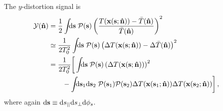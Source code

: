 \documentclass[fleqn,usenatbib]{mnras}
\begin{document}
    The $y$-distortion signal is 
    \begin{align}
        \Yd(\nhat)
            &=  \frac{1}{2}
                \int\!\!\!\dif{\mbf{s}}\;
                    \mcal{P}(\mbf{s})
                    \left(\frac{T(\mbf{x}(\mbf{s};\nhat))-\bar{T}(\nhat)}{\bar{T}(\nhat)}\right)^2
            \\
            &\simeq
                \frac{1}{2T_0^2}
                \int\!\!\!\dif{\mbf{s}}\;
                    \mcal{P}(\mbf{s})
                    \left( \DeltaT(\mbf{x}(\mbf{s};\nhat))- \Delta \bar{T}(\nhat) \right)^2
            \\
            &=
                \frac{1}{2T_0^2}
                \bigg[
                    \int\!\!\!\dif{\mbf{s}}\; \mcal{P}(\mbf{s}) \left( \DeltaT(\mbf{x}(\mbf{s};\mbf{\nhat}))\right)^2 & \label{eq:signal_realspace}
                    \\ &\qquad
                    - \int\!\!\!\dif{\mbf{s}_1}\dif{\mbf{s}_2}\;
                        \mcal{P}(\mbf{s}_1) \mcal{P}(\mbf{s}_2)
                        \DeltaT(\mbf{x}(\mbf{s}_1;\mbf{\nhat}))
                        \DeltaT(\mbf{x}(\mbf{s}_2;\mbf{\nhat}))
                \bigg]\nonumber \,,
    \end{align}
    where again $\dif{\mbf{s}}\equiv \dif{\spll}\dif{\sprp} \dif{\phi_s}$.
\end{document}
